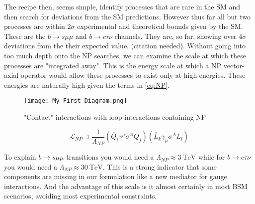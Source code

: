 The recipe then, seems simple, identify processes that are rare in the SM and then search for deviations from the SM predictions. However thus far all but two processes are within $2\sigma$ experimental and theoretical bounds given by the SM. 
%
These are the $b \rightarrow s \mu \mu$ and $b \rightarrow c \tau \nu$ channels. They are, so far, showing over $ 4 \sigma$ deviations from the their expected value. {\color{blue} (citation needed)}.
%
Without going into too much depth onto the NP searches, we can examine the scale at which these processes are "integrated away". This is the energy scale at which a NP vector-axial operator would allow these processes to exist only at high energies. These energies are naturally high given the terms in \ref{eq:NP}. 
%
\bigbreak
%
\noindent\begin{minipage}{.3\textwidth}
	\begin{figure}[H]
		\label{fig:contactNP}
		\centering
		\texttt{[image: My\_First\_Diagram.png]}
		\caption{"Contact" interactions with loop interactions containing NP}
	\end{figure}
\end{minipage}
\begin{minipage}{.6\textwidth}
\begin{equation}
\label{eq:NP}
\mathcal{L}_{NP} \supset \frac{1}{\Lambda_{NP}} (\overline{Q}_i \gamma^\mu \sigma^A Q_j ) (\overline{L}_k \gamma_\mu \sigma^A L_l) 
\end{equation}
\end{minipage}
%
\bigbreak
%
To explain $b \rightarrow s \mu \mu$ transitions you would need a $\Lambda_{NP} \approx 3 \ \text{TeV}$ while for $b \rightarrow c \tau \nu$ you would need a $\Lambda_{NP} \approx 30\ \text{TeV}$. This is a strong indicator that some components are missing in our formulation like a new mediator for gauge interactions. And the advantage of this scale is it almost certainly in most BSM scenarios, avoiding most experimental constraints.

